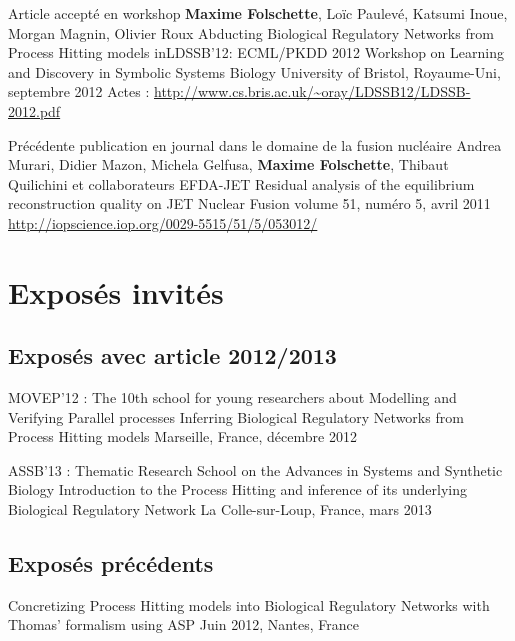 \publi
{Article accepté en workshop \rev}{\cite{FPIMR12-LDSSB}}
{\textbf{Maxime Folschette}, Loïc Paulevé, Katsumi Inoue, Morgan Magnin, Olivier Roux}
{Abducting Biological Regulatory Networks from Process Hitting models}
{in}{LDSSB'12: ECML/PKDD 2012 Workshop on Learning and Discovery in Symbolic Systems Biology}
{University of Bristol, Royaume-Uni, septembre 2012}
{Actes : \url{http://www.cs.bris.ac.uk/~oray/LDSSB12/LDSSB-2012.pdf}}

\publi
{Précédente publication en journal \rev}{dans le domaine de la fusion nucléaire}
{Andrea Murari, Didier Mazon, Michela Gelfusa, \textbf{Maxime Folschette}, Thibaut Quilichini et collaborateurs EFDA-JET}
{Residual analysis of the equilibrium reconstruction quality on JET}
{}{Nuclear Fusion}
{volume 51, numéro 5, avril 2011}%
{\url{http://iopscience.iop.org/0029-5515/51/5/053012/}}



\section{Exposés invités}

\subsection{Exposés avec article 2012/2013}

\expose
{MOVEP'12 : The 10th school for young researchers about Modelling and Verifying Parallel processes}
{Inferring Biological Regulatory Networks from Process Hitting models}
{Marseille, France, décembre 2012}

\expose
{ASSB'13 : Thematic Research School on the Advances in Systems and Synthetic Biology}
{Introduction to the Process Hitting and inference of its underlying Biological Regulatory Network}
{La Colle-sur-Loup, France, mars 2013}





\subsection{Exposés précédents}

{Concretizing Process Hitting models into Biological Regulatory Networks with Thomas' formalism using ASP}
{Juin 2012, Nantes, France}

